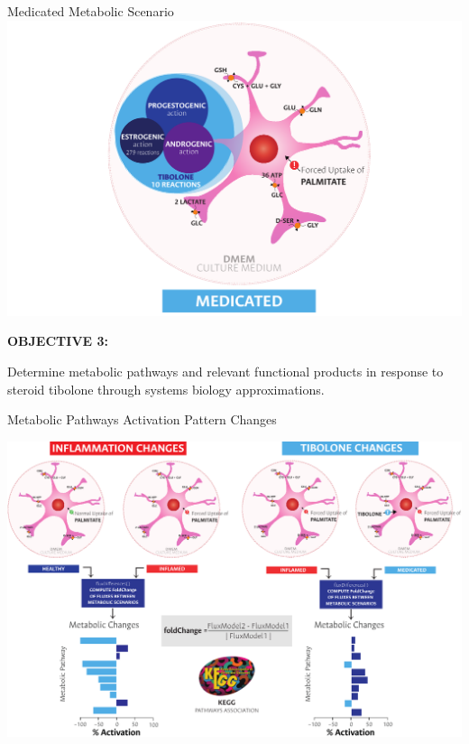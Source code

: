 \documentclass[11pt]{beamer}
\begin{document}
\begin{frame}{Medicated Metabolic Scenario}
\includegraphics[width=\textwidth]{Medicated}
\end{frame}
\begin{frame}
\begin{block}{\textbf{OBJECTIVE 3:}}
\begin{center}
Determine metabolic pathways and relevant functional products in response to steroid tibolone through systems biology approximations.\end{center}\end{block}
\end{frame}
\begin{frame}{Metabolic Pathways Activation Pattern Changes}
\begin{center}
\includegraphics[width=\textwidth]{FluxDifferenes}
\end{center}
\end{frame}
\end{document}
